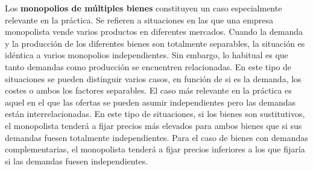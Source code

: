 \documentclass{nuevotema}
\begin{document}
Los \textbf{monopolios de múltiples bienes} constituyen un caso especialmente relevante en la práctica. Se refieren a situaciones en las que una empresa monopolista vende varios productos en diferentes mercados. Cuando la demanda y la producción de los diferentes bienes son totalmente separables, la situación es idéntica a varios monopolios independientes. Sin embargo, lo habitual es que tanto demandas como producción se encuentren relacionadas. En este tipo de situaciones se pueden distinguir varios casos, en función de si es la demanda, los costes o ambos los factores separables. El caso más relevante en la práctica es aquel en el que las ofertas se pueden asumir independientes pero las demandas están interrelacionadas. En este tipo de situaciones, si los bienes son sustitutivos, el monopolista tenderá a fijar precios más elevados para ambos bienes que si sus demandas fuesen totalmente independientes. Para el caso de bienes con demandas complementarias, el monopolista tenderá a fijar precios inferiores a los que fijaría si las demandas fuesen independientes. 
\end{document}

